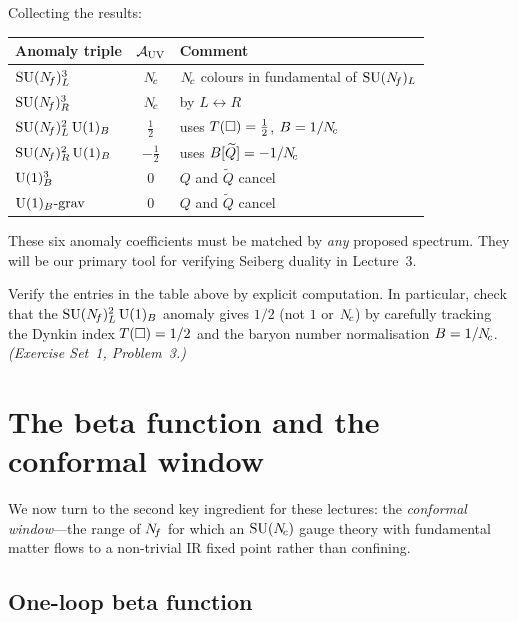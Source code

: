 \documentclass[11pt,a4paper]{article}
\begin{document}
\noindent Collecting the results:

\begin{center}
\renewcommand{\arraystretch}{1.3}
\begin{tabular}{@{}l c l@{}}
\toprule
\textbf{Anomaly triple} & $\mathcal{A}_{\mathrm{UV}}$ & \textbf{Comment} \\
\midrule
$\mathrm{SU}(N_{\!f})_L^3$ & $N_{\!c}$ & $N_{\!c}$ colours in fundamental of $\mathrm{SU}(N_{\!f})_L$ \\
$\mathrm{SU}(N_{\!f})_R^3$ & $N_{\!c}$ & by $L \leftrightarrow R$ \\
$\mathrm{SU}(N_{\!f})_L^2\,\mathrm{U}(1)_B$ & $\frac{1}{2}$ & uses $T(\square) = \frac{1}{2}$,
  $B = 1/N_{\!c}$ \\
$\mathrm{SU}(N_{\!f})_R^2\,\mathrm{U}(1)_B$ & $-\frac{1}{2}$ & uses $B[\widetilde{Q}] = -1/N_{\!c}$ \\
$\mathrm{U}(1)_B^3$ & $0$ & $Q$ and $\widetilde{Q}$ cancel \\
$\mathrm{U}(1)_B\text{-grav}$ & $0$ & $Q$ and $\widetilde{Q}$ cancel \\
\bottomrule
\end{tabular}
\end{center}

These six anomaly coefficients must be matched by \emph{any} proposed
\IR{} spectrum.  They will be our primary tool for verifying Seiberg
duality in Lecture~3.

\begin{exercise}
  Verify the entries in the table above by explicit computation.  In
  particular, check that the $\mathrm{SU}(N_{\!f})_L^2\,\mathrm{U}(1)_B$ anomaly gives
  $1/2$ (not $1$ or $N_{\!c}$) by carefully tracking the Dynkin index
  $T(\square) = 1/2$ and the baryon number normalisation $B = 1/N_{\!c}$.
  \textit{(Exercise Set~1, Problem~3.)}
\end{exercise}


\section{The beta function and the conformal window}
\label{sec:conformal}

We now turn to the second key ingredient for these lectures: the
\emph{conformal window}---the range of $N_{\!f}$ for which an $\mathrm{SU}(N_{\!c})$ gauge
theory with fundamental matter flows to a non-trivial IR fixed point rather
than confining.

\subsection{One-loop beta function}
\end{document}

